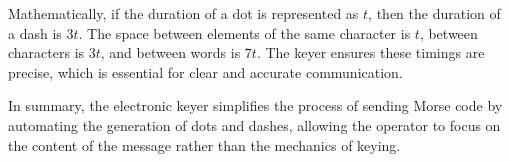 Mathematically, if the duration of a dot is represented as \( t \), then the duration of a dash is \( 3t \). The space between elements of the same character is \( t \), between characters is \( 3t \), and between words is \( 7t \). The keyer ensures these timings are precise, which is essential for clear and accurate communication.

In summary, the electronic keyer simplifies the process of sending Morse code by automating the generation of dots and dashes, allowing the operator to focus on the content of the message rather than the mechanics of keying.

